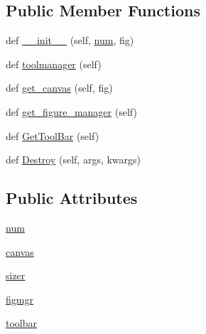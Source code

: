 \subsection*{Public Member Functions}
\begin{DoxyCompactItemize}
\item 
def \hyperlink{classmatplotlib_1_1backends_1_1backend__wx_1_1FigureFrameWx_aac9a09697550bc42bc5de562fbcbda8d}{\+\_\+\+\_\+init\+\_\+\+\_\+} (self, \hyperlink{classmatplotlib_1_1backends_1_1backend__wx_1_1FigureFrameWx_a588e50f24bf322968625b13dfe333240}{num}, fig)
\item 
def \hyperlink{classmatplotlib_1_1backends_1_1backend__wx_1_1FigureFrameWx_af5d4a089fcb5fa9be0f7c771c3241897}{toolmanager} (self)
\item 
def \hyperlink{classmatplotlib_1_1backends_1_1backend__wx_1_1FigureFrameWx_ac37603ec20eda8254998ee8c0dd667b0}{get\+\_\+canvas} (self, fig)
\item 
def \hyperlink{classmatplotlib_1_1backends_1_1backend__wx_1_1FigureFrameWx_ad5962bff5fa3de6b746dfecae46afaab}{get\+\_\+figure\+\_\+manager} (self)
\item 
def \hyperlink{classmatplotlib_1_1backends_1_1backend__wx_1_1FigureFrameWx_a6158893544adc1fd59144ac899338167}{Get\+Tool\+Bar} (self)
\item 
def \hyperlink{classmatplotlib_1_1backends_1_1backend__wx_1_1FigureFrameWx_a85e7dfcbdbf01c7cef077e68c4eb2a7f}{Destroy} (self, args, kwargs)
\end{DoxyCompactItemize}
\subsection*{Public Attributes}
\begin{DoxyCompactItemize}
\item 
\hyperlink{classmatplotlib_1_1backends_1_1backend__wx_1_1FigureFrameWx_a588e50f24bf322968625b13dfe333240}{num}
\item 
\hyperlink{classmatplotlib_1_1backends_1_1backend__wx_1_1FigureFrameWx_a296a2b2d464d640717f889a68c19779a}{canvas}
\item 
\hyperlink{classmatplotlib_1_1backends_1_1backend__wx_1_1FigureFrameWx_a49a2568a2e8b3fd314a974a8e679b986}{sizer}
\item 
\hyperlink{classmatplotlib_1_1backends_1_1backend__wx_1_1FigureFrameWx_a39843e28be05a578bfdd3a0b972806e8}{figmgr}
\item 
\hyperlink{classmatplotlib_1_1backends_1_1backend__wx_1_1FigureFrameWx_a678f1fd1e8cd5b06ff862a2950f9f94a}{toolbar}
\end{DoxyCompactItemize}


